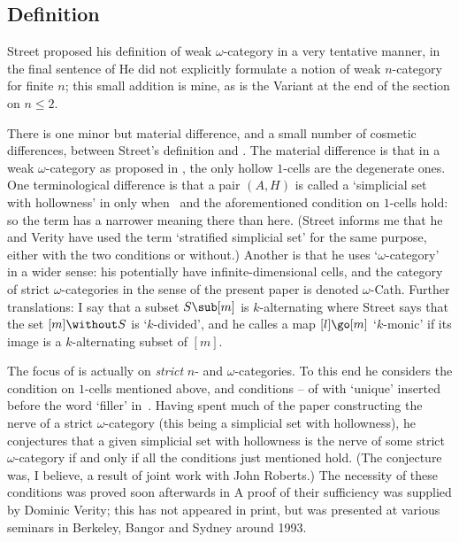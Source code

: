 \subsection*{Definition }

Street proposed his definition of weak $\omega$-category in a very tentative
manner, in the final sentence of
% 
%
% 
He did not explicitly formulate a notion of weak $n$-category for finite
$n$; this small addition is mine, as is the Variant at the end of the
section on $n\leq 2$.  

There is one minor but material difference, and a small number of cosmetic
differences, between Street's definition and .  The material
difference is that in a weak $\omega$-category as proposed in ,
the only hollow $1$-cells are the degenerate ones.  One terminological
difference is that a pair $(A,H)$ is called a `simplicial set with
hollowness' in  only when~ and the
aforementioned condition on $1$-cells hold: so the term has a narrower
meaning there than here.  (Street informs me that he and Verity have used the
term `stratified simplicial set' for the same purpose, either with the two
conditions or without.)  Another is that he uses `$\omega$-category' in a
wider sense: his potentially have infinite-dimensional cells, and the
category of strict $\omega$-categories in the sense of the present paper is
denoted $\omega$-Cath.  Further translations: I say that a subset $S \sub
[m]$ is $k$-alternating where Street says that the set $[m]\without S$ is
`$k$-divided', and he calles a map $[l] \go [m]$ `$k$-monic' if its image is
a $k$-alternating subset of $[m]$.

The focus of  is actually on \emph{strict} $n$- and
$\omega$-categories.  To this end he considers the condition on $1$-cells
mentioned above, and conditions -- of
 with `unique' inserted before the word `filler'
in~.  Having spent much of the paper constructing the nerve
of a strict $\omega$-category (this being a simplicial set with hollowness),
he conjectures that a given simplicial set with hollowness is the nerve of
some strict $\omega$-category if and only if all the conditions just
mentioned hold.  (The conjecture was, I believe, a result of joint work with
John Roberts.)  The necessity of these conditions was proved soon afterwards
in
% 
%
% 
A proof of their sufficiency was supplied by Dominic Verity; this has not
appeared in print, but was presented at various seminars in Berkeley, Bangor
and Sydney around 1993.

